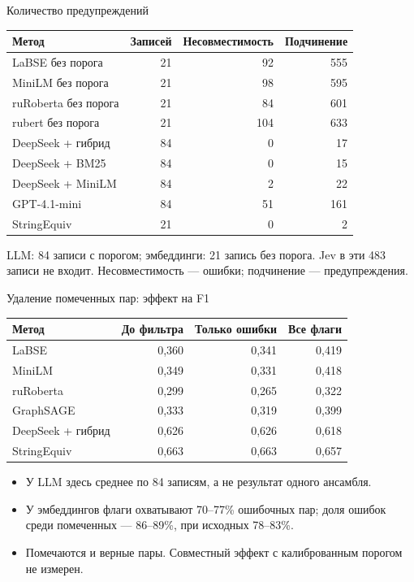\documentclass[aspectratio=169,11pt]{beamer}
\begin{document}
\renewcommand{\hseheadertext}{Дополнительные материалы}
\begin{frame}{Количество предупреждений}
  \begin{tabular}{@{}lrrr@{}}
    \toprule
    Метод & Записей & Несовместимость & Подчинение \\
    \midrule
    LaBSE без порога & 21 & 92 & 555 \\
    MiniLM без порога & 21 & 98 & 595 \\
    ruRoberta без порога & 21 & 84 & 601 \\
    rubert без порога & 21 & 104 & 633 \\
    DeepSeek + гибрид & 84 & 0 & 17 \\
    DeepSeek + BM25 & 84 & 0 & 15 \\
    DeepSeek + MiniLM & 84 & 2 & 22 \\
    GPT-4.1-mini & 84 & 51 & 161 \\
    StringEquiv & 21 & 0 & 2 \\
    \bottomrule
  \end{tabular}
  \par\medskip
  LLM: 84 записи с порогом;
  эмбеддинги: 21 запись без порога. Jev в эти 483 записи не входит.
  Несовместимость — ошибки; подчинение — предупреждения.
\end{frame}

\renewcommand{\hseheadertext}{Дополнительные материалы}
\begin{frame}{Удаление помеченных пар: эффект на F1}
  \begin{tabular}{@{}lrrr@{}}
    \toprule
    Метод & До фильтра & Только ошибки & Все флаги \\
    \midrule
    LaBSE & 0{,}360 & 0{,}341 & 0{,}419 \\
    MiniLM & 0{,}349 & 0{,}331 & 0{,}418 \\
    ruRoberta & 0{,}299 & 0{,}265 & 0{,}322 \\
    GraphSAGE & 0{,}333 & 0{,}319 & 0{,}399 \\
    DeepSeek + гибрид & 0{,}626 & 0{,}626 & 0{,}618 \\
    StringEquiv & 0{,}663 & 0{,}663 & 0{,}657 \\
    \bottomrule
  \end{tabular}
  \medskip
  \begin{itemize}
    \item У LLM здесь среднее по 84 записям, а не результат одного ансамбля.
    \item У эмбеддингов флаги охватывают 70--77\% ошибочных пар;
      доля ошибок среди помеченных — 86--89\%, при исходных 78--83\%.
    \item Помечаются и верные пары. Совместный эффект с калиброванным порогом не измерен.
  \end{itemize}
\end{frame}
\end{document}
